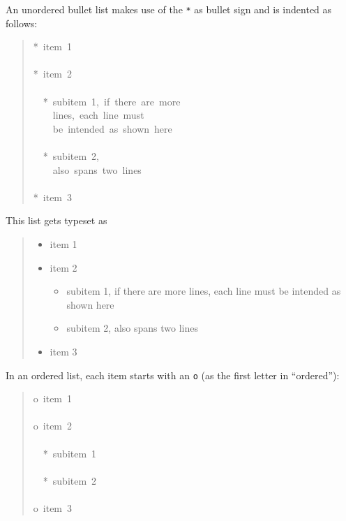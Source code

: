 \documentclass[a4paper,english]{article}
\begin{document}
An unordered bullet list makes use of the \texttt{*} as bullet sign
and is indented as follows:
%
\begin{quote}{\ttfamily \raggedright \noindent
*~item~1\\
~\\
*~item~2\\
~\\
~~*~subitem~1,~if~there~are~more\\
~~~~lines,~each~line~must\\
~~~~be~intended~as~shown~here\\
~\\
~~*~subitem~2,\\
~~~~also~spans~two~lines\\
~\\
*~item~3
}
\end{quote}

This list gets typeset as
%
\begin{quote}
%
\begin{itemize}

\item item 1

\item item 2
%
\begin{itemize}

\item subitem 1, if there are more
lines, each line must
be intended as shown here

\item subitem 2,
also spans two lines

\end{itemize}

\item item 3

\end{itemize}

\end{quote}

In an ordered list, each item starts with an \texttt{o} (as the first letter
in ``ordered''):
%
\begin{quote}{\ttfamily \raggedright \noindent
o~item~1\\
~\\
o~item~2\\
~\\
~~*~subitem~1\\
~\\
~~*~subitem~2\\
~\\
o~item~3
}
\end{quote}
\end{document}
